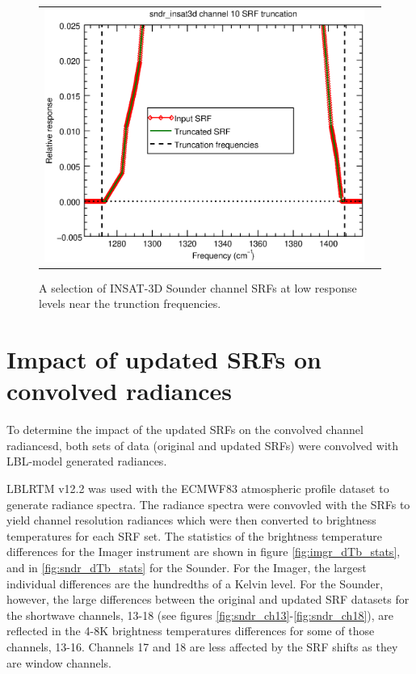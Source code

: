 \begin{figure}[H]
\begin{tabular}{c c}
    \includegraphics[scale=0.35]{graphics/sndr/trunc/sndr_insat3d-10.trunc.eps}
  \end{tabular}
  \caption{A selection of INSAT-3D Sounder channel SRFs at low response levels near the trunction frequencies.}
  \label{fig:sndr_selection_trunc}
\end{figure}


\newpage
\section{Impact of updated SRFs on convolved radiances}
\label{sec:updated_impact}
To determine the impact of the updated SRFs on the convolved channel radiancesd, both sets of data (original and updated SRFs) were convolved with LBL-model generated radiances.

LBLRTM \citep{Clough_2005} v12.2 was used with the ECMWF83 atmospheric profile dataset to generate radiance spectra. The radiance spectra were convovled with the SRFs to yield channel resolution radiances which were then converted to brightness temperatures for each SRF set. The statistics of the brightness temperature differences for the Imager instrument are shown in figure \ref{fig:imgr_dTb_stats}, and in \ref{fig:sndr_dTb_stats} for the Sounder. For the Imager, the largest individual differences are the hundredths of a Kelvin level. For the Sounder, however, the large differences between the original and updated SRF datasets for the shortwave channels, 13-18 (see figures \ref{fig:sndr_ch13}-\ref{fig:sndr_ch18}), are reflected in the 4-8K brightness temperatures differences for some of those channels, 13-16. Channels 17 and 18 are less affected by the SRF shifts as they are window channels.

